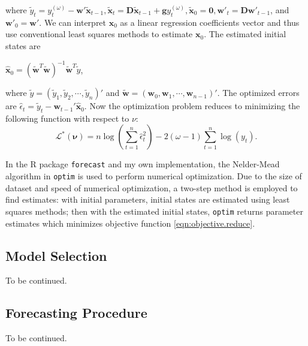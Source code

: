 \documentclass{uwstat572}
\newcommand{\vmadd}[1]{\textbf{\color{red}{#1}}}
\begin{document}
where $ \tilde{y}_t=y_t^{(\omega)}- \textbf{w}' \tilde{\textbf{x}}_{t-1}, \tilde{\textbf{x}}_t=\textbf{D}\tilde{\textbf{x}}_{t-1}+\textbf{g}y_t^{(\omega)}, \tilde{\textbf{x}}_0=\textbf{0}, \textbf{w}'_{t}=\textbf{D}\textbf{w}'_{t-1}$, and $\textbf{w}'_{0}=\textbf{w}'$. We can interpret $\textbf{x}_0$ as a linear regression coefficients vector and thus use conventional least squares methods to estimate $\textbf{x}_0$. The estimated initial states are 
\begin{center}
$\displaystyle \hat{\textbf{x}}_0 = (\tilde{\textbf{w}}^T \tilde{\textbf{w}})^{-1}\tilde{\textbf{w}}^T \tilde{y}$,
\end{center}
where $\tilde{y}=(\tilde{y}_1 ,\tilde{y}_2  , \cdots , \tilde{y}_n )' $ and $\tilde{\textbf{w}}=(\textbf{w}_0 ,\textbf{w}_1  ,\cdots , \textbf{w}_{n-1})'$. The optimized errors are $\hat{\epsilon}_t=\tilde{y}_t-\textbf{w}_{t-1}' \hat{\textbf{x}}_0$. Now the optimization problem reduces to minimizing the following function with respect to $\nu$:
\begin{equation}
\mathcal{L}^{*}(\bm{\nu})=n \log (\sum\limits_{t=1}^n \hat{\epsilon}_t^2)-2(\omega-1) \sum\limits_{t=1}^n \log(y_t).
\label{eqn:objective.reduce}
\end{equation}

In the R package \texttt{forecast} and my own implementation, the Nelder-Mead algorithm in \vmadd{the R base function} \texttt{optim} is used to perform numerical optimization. 
Due to the size of dataset and speed of numerical optimization, a two-step method is employed to find estimates: with initial parameters, initial states are estimated using least squares methods; then with the estimated initial states, \texttt{optim} returns parameter estimates which minimizes \vmadd{the} objective function \eqref{eqn:objective.reduce}.  

\subsection{Model Selection}
\label{sec:selection}
To be continued.
\subsection{Forecasting Procedure}
To be continued.
\nocite{*}


\end{document}
